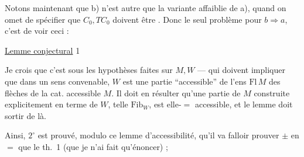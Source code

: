 
Notons maintenant que b) n'est autre que
la variante affaiblie de a), quand on omet
de spécifier que $C_0,TC_0$ doivent être .
Donc le seul problème pour $b\Rightarrow a$,
c'est de voir ceci :

\uline{Lemme conjectural} \textcircled{1} 


Je crois que c'est 
sous les hypothèses faites sur $M,W$ ---
qui doivent impliquer que dans un sens
convenable, $W$ est une partie ``accessible''
de l'ens $\mathrm{Fl}\,M$ des flèches de la cat.
accessible $M$. Il doit en résulter qu'une
partie de $M$ construite explicitement en
terme de $W$, telle $\mathrm{Fib}_W$, est elle-$=$
accessible, et le lemme doit sortir de
là.

Ainsi, $2^\circ$ est prouvé, modulo ce lemme
d'accessibilité, qu'il va falloir prouver
$\pm$ en $=$  que le th.~1 (que je n'ai
fait  qu'énoncer) ;
